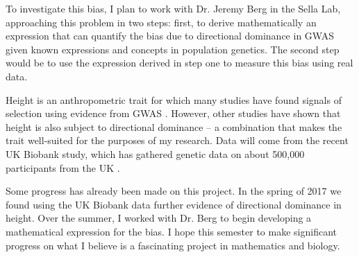 \documentclass[a4paper,10pt]{article}
\begin{document}
To investigate this bias, I plan to work with Dr. Jeremy Berg in the
Sella Lab, approaching this problem in two steps: first, to derive
mathematically an expression that can quantify the bias due to
directional dominance in GWAS given known expressions and concepts in
population genetics. The second step would be to use the expression
derived in step one to measure this bias using real data.

Height is an anthropometric trait for which many studies have found signals
of selection using
evidence from GWAS \cite{heightselection} . However, other studies have shown that
height is also subject to directional dominance \cite{heightdirectdom}
-- a combination that
makes the trait well-suited for the purposes of my research. Data will
come from the recent UK Biobank study, which has gathered genetic data
on about 500,000 participants from the UK \cite{biobank} .

Some progress has already been made on this project. In the spring of
2017 we found using the UK Biobank data further evidence of
directional dominance in height. Over the summer, I worked
with Dr. Berg to begin developing a mathematical expression for the
bias. I hope this semester to make significant progress on what I
believe is a fascinating project in mathematics and biology. 



\end{document}
